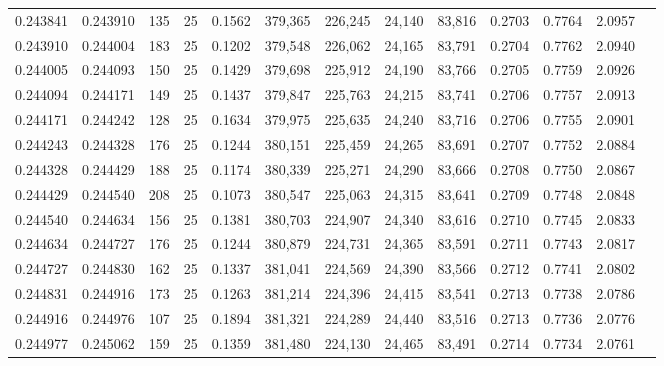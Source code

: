 \begin{tabular}{rrrrrrrrrrrrr}
0.243841 & 0.243910 &   135 &  25 &                                     0.1562 & 379,365 & 226,245 &  24,140 &  83,816 & 0.2703 & 0.7764 & 2.0957 \\
0.243910 & 0.244004 &   183 &  25 &                                     0.1202 & 379,548 & 226,062 &  24,165 &  83,791 & 0.2704 & 0.7762 & 2.0940 \\
0.244005 & 0.244093 &   150 &  25 &                                     0.1429 & 379,698 & 225,912 &  24,190 &  83,766 & 0.2705 & 0.7759 & 2.0926 \\
0.244094 & 0.244171 &   149 &  25 &                                     0.1437 & 379,847 & 225,763 &  24,215 &  83,741 & 0.2706 & 0.7757 & 2.0913 \\
0.244171 & 0.244242 &   128 &  25 &                                     0.1634 & 379,975 & 225,635 &  24,240 &  83,716 & 0.2706 & 0.7755 & 2.0901 \\
0.244243 & 0.244328 &   176 &  25 &                                     0.1244 & 380,151 & 225,459 &  24,265 &  83,691 & 0.2707 & 0.7752 & 2.0884 \\
0.244328 & 0.244429 &   188 &  25 &                                     0.1174 & 380,339 & 225,271 &  24,290 &  83,666 & 0.2708 & 0.7750 & 2.0867 \\
0.244429 & 0.244540 &   208 &  25 &                                     0.1073 & 380,547 & 225,063 &  24,315 &  83,641 & 0.2709 & 0.7748 & 2.0848 \\
0.244540 & 0.244634 &   156 &  25 &                                     0.1381 & 380,703 & 224,907 &  24,340 &  83,616 & 0.2710 & 0.7745 & 2.0833 \\
0.244634 & 0.244727 &   176 &  25 &                                     0.1244 & 380,879 & 224,731 &  24,365 &  83,591 & 0.2711 & 0.7743 & 2.0817 \\
0.244727 & 0.244830 &   162 &  25 &                                     0.1337 & 381,041 & 224,569 &  24,390 &  83,566 & 0.2712 & 0.7741 & 2.0802 \\
0.244831 & 0.244916 &   173 &  25 &                                     0.1263 & 381,214 & 224,396 &  24,415 &  83,541 & 0.2713 & 0.7738 & 2.0786 \\
0.244916 & 0.244976 &   107 &  25 &                                     0.1894 & 381,321 & 224,289 &  24,440 &  83,516 & 0.2713 & 0.7736 & 2.0776 \\
0.244977 & 0.245062 &   159 &  25 &                                     0.1359 & 381,480 & 224,130 &  24,465 &  83,491 & 0.2714 & 0.7734 & 2.0761 \\

\end{tabular}
